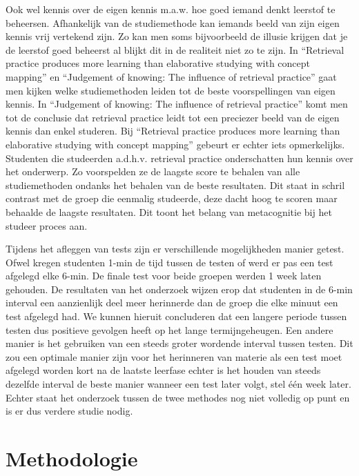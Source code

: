\documentclass{hogent-article}
\begin{document}
Ook wel kennis over de eigen kennis m.a.w. hoe goed iemand denkt leerstof te beheersen. Afhankelijk van de studiemethode kan iemands beeld van zijn eigen kennis vrij vertekend zijn. Zo kan men soms bijvoorbeeld de illusie krijgen dat je de leerstof goed beheerst al blijkt dit in de realiteit niet zo te zijn. In “Retrieval practice produces more learning than elaborative studying with concept mapping” en “Judgement of knowing: The influence of retrieval practice” gaat men kijken welke studiemethoden leiden tot de beste voorspellingen van eigen kennis. In “Judgement of knowing: The influence of retrieval practice” komt men tot de conclusie dat retrieval practice leidt tot een preciezer beeld van de eigen kennis dan enkel studeren. Bij “Retrieval practice produces more learning than elaborative studying with concept mapping” gebeurt er echter iets opmerkelijks. Studenten die studeerden a.d.h.v. retrieval practice onderschatten hun kennis over het onderwerp. Zo voorspelden ze de laagste score te behalen van alle studiemethoden ondanks het behalen van de beste resultaten. Dit staat in schril contrast met de groep die eenmalig studeerde, deze dacht hoog te scoren maar behaalde de laagste resultaten. Dit toont het belang van metacognitie bij het studeer proces aan.
\cite{Karpicke2011}
\smallskip

Tijdens het afleggen van tests zijn er verschillende mogelijkheden manier getest. Ofwel kregen studenten 1-min de tijd tussen de testen of werd er pas een test afgelegd elke 6-min. De finale test voor beide groepen werden 1 week laten gehouden. De resultaten van het onderzoek wijzen erop dat studenten in de 6-min interval een aanzienlijk deel meer herinnerde dan de groep die elke minuut een test afgelegd had. We kunnen hieruit concluderen dat een langere periode tussen testen dus positieve gevolgen heeft op het lange termijngeheugen. Een andere manier is het gebruiken van een steeds groter wordende interval tussen testen. Dit zou een optimale manier zijn voor het herinneren van materie als een test moet afgelegd worden kort na de laatste leerfase echter is het houden van steeds dezelfde interval de beste manier wanneer een test later volgt, stel één week later. Echter staat het onderzoek tussen de twee methodes nog niet volledig op punt en is er dus verdere studie nodig. 







\section{Methodologie}
\end{document}

